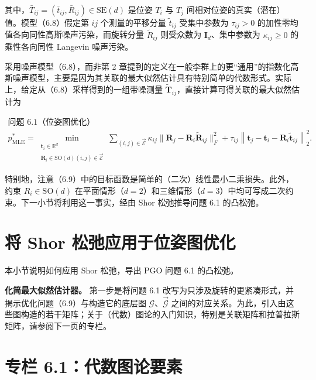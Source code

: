 其中，$\bar { T } _ { i j } = ( \bar { t } _ { i j } , \bar { R } _ { i j } ) \in \mathrm { S E } ( d )$ 是位姿 $T_i$ 与 $T_j$ 间相对位姿的真实（潜在）值。模型（6.8）假定第 $ij$ 个测量的平移分量 $\tilde { t } _ { i j }$ 受集中参数为 $\tau _ { i j } > 0$ 的加性零均值各向同性高斯噪声污染，而旋转分量 $\tilde { R } _ { i j }$ 则受众数为 $\mathbf { I } _ { d }$、集中参数为 $\kappa _ { i j } \geq 0$ 的乘性各向同性 Langevin 噪声污染。

采用噪声模型（6.8），而非第 2 章提到的定义在一般李群上的更“通用”的指数化高斯噪声模型，主要是因为其关联的最大似然估计具有特别简单的代数形式。实际上，给定从（6.8）采样得到的一组带噪测量 $\tilde { \mathbf { { T } } } _ { i j }$，直接计算可得关联的最大似然估计为

\begin{equation}
\begin{array}{c} \text {问题 6.1（位姿图优化）} \\ p _ {\mathrm{MLE}} ^ {*} = \min_ {\substack {\boldsymbol {t} _ {i} \in \mathbb {R} ^ {d} \\ \boldsymbol {R} _ {i} \in \mathrm{SO} (d) (i, j) \in \overrightarrow {\mathcal {E}}}} \sum_ {(i, j) \in \overrightarrow {\mathcal {E}}} \kappa_ {i j} \| \boldsymbol {R} _ {j} - \boldsymbol {R} _ {i} \tilde {\boldsymbol {R}} _ {i j} \| _ {F} ^ {2} + \tau_ {i j} \left\| \boldsymbol {t} _ {j} - \boldsymbol {t} _ {i} - \boldsymbol {R} _ {i} \tilde {\boldsymbol {t}} _ {i j} \right\| _ {2} ^ {2}. \end{array}\tag{6.9}
\end{equation}

特别地，注意（6.9）中的目标函数是简单的（二次）线性最小二乘损失。此外，约束 $R _ { i } \in \mathrm { S O } ( d )$ 在平面情形（$d = 2$）和三维情形（$d = 3$）中均可写成二次约束。下一小节将利用这一事实，经由 Shor 松弛推导问题 6.1 的凸松弛。

\section{将 Shor 松弛应用于位姿图优化}

本小节说明如何应用 Shor 松弛，导出 PGO 问题 6.1 的凸松弛。

\textbf{化简最大似然估计器。} 第一步是将问题 6.1 改写为只涉及旋转的更紧凑形式，并揭示优化问题（6.9）与构造它的底层图 $\mathcal { G }$、$\vec { \mathcal { G } }$ 之间的对应关系。为此，引入由这些图构造的若干矩阵；关于（代数）图论的入门知识，特别是关联矩阵和拉普拉斯矩阵，请参阅下一页的专栏。

\section{专栏 6.1：代数图论要素}

